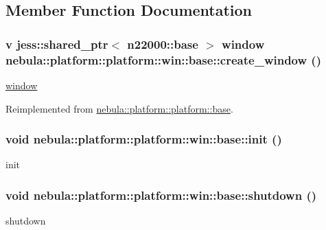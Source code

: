 \subsection{Member Function Documentation}
\hypertarget{classnebula_1_1platform_1_1platform_1_1win_1_1base_a6789ffe77928a45dc3cbd6dea0fd2d4b}{
\subsubsection[{create\_\-window}]{\setlength{\rightskip}{0pt plus 5cm}v jess::shared\_\-ptr$<$ {\bf n22000::base} $>$ window nebula::platform::platform::win::base::create\_\-window ()}}
\label{classnebula_1_1platform_1_1platform_1_1win_1_1base_a6789ffe77928a45dc3cbd6dea0fd2d4b}
\hyperlink{namespacenebula_1_1platform_1_1window}{window} 

Reimplemented from \hyperlink{classnebula_1_1platform_1_1platform_1_1base_a3ea2aaff05ce1406a0fd0e72bdc7074c}{nebula::platform::platform::base}.\hypertarget{classnebula_1_1platform_1_1platform_1_1win_1_1base_a821e7025682331035b371c5aaa709cf4}{
\subsubsection[{init}]{\setlength{\rightskip}{0pt plus 5cm}void nebula::platform::platform::win::base::init ()}}
\label{classnebula_1_1platform_1_1platform_1_1win_1_1base_a821e7025682331035b371c5aaa709cf4}
init \hypertarget{classnebula_1_1platform_1_1platform_1_1win_1_1base_ab01580e3a7d8e146512d5a23fb5c9bb1}{
\subsubsection[{shutdown}]{\setlength{\rightskip}{0pt plus 5cm}void nebula::platform::platform::win::base::shutdown ()}}
\label{classnebula_1_1platform_1_1platform_1_1win_1_1base_ab01580e3a7d8e146512d5a23fb5c9bb1}
shutdown 

